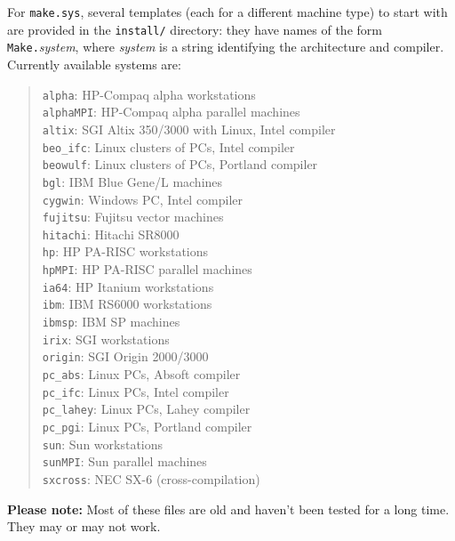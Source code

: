 \documentclass[12pt,a4paper]{article}
\begin{document}
For \texttt{make.sys}, several templates (each for a different machine
type) to start with are provided in the \texttt{install/} directory:
they have names of the form \texttt{Make.}\emph{system}, where
\emph{system} is a string identifying the architecture and compiler.
Currently available systems are:
\begin{quote}
  \texttt{alpha}:     HP-Compaq alpha workstations\\
  \texttt{alphaMPI}:  HP-Compaq alpha parallel machines\\
  \texttt{altix}:     SGI Altix 350/3000 with Linux, Intel compiler\\
  \texttt{beo\_ifc}:  Linux clusters of PCs, Intel compiler\\
  \texttt{beowulf}:   Linux clusters of PCs, Portland compiler\\
  \texttt{bgl}:       IBM Blue Gene/L machines\\
  \texttt{cygwin}:    Windows PC, Intel compiler\\
  \texttt{fujitsu}:   Fujitsu vector machines\\
  \texttt{hitachi}:   Hitachi SR8000\\
  \texttt{hp}:        HP PA-RISC workstations\\
  \texttt{hpMPI}:     HP PA-RISC parallel machines\\
  \texttt{ia64}:      HP Itanium workstations\\
  \texttt{ibm}:       IBM RS6000 workstations\\
  \texttt{ibmsp}:     IBM SP machines\\
  \texttt{irix}:      SGI workstations\\
  \texttt{origin}:    SGI Origin 2000/3000\\
  \texttt{pc\_abs}:   Linux PCs, Absoft compiler\\
  \texttt{pc\_ifc}:   Linux PCs, Intel compiler\\
  \texttt{pc\_lahey}: Linux PCs, Lahey compiler\\
  \texttt{pc\_pgi}:   Linux PCs, Portland compiler\\
  \texttt{sun}:       Sun workstations\\
  \texttt{sunMPI}:    Sun parallel machines\\
  \texttt{sxcross}:   NEC SX-6 (cross-compilation)
\end{quote}
\textbf{Please note:}
Most of these files are old and haven't been tested for a long time.
They may or may not work.
\end{document}
